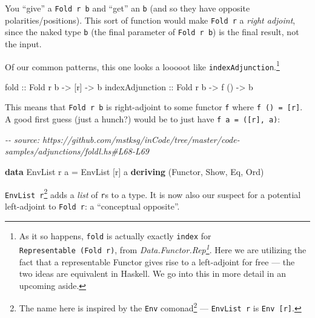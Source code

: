 \documentclass[]{article}
\newenvironment{Shaded}{}{}
\newcommand{\CommentTok}[1]{\textcolor[rgb]{0.38,0.63,0.69}{\textit{#1}}}
\newcommand{\DataTypeTok}[1]{\textcolor[rgb]{0.56,0.13,0.00}{#1}}
\newcommand{\KeywordTok}[1]{\textcolor[rgb]{0.00,0.44,0.13}{\textbf{#1}}}
\newcommand{\NormalTok}[1]{#1}
\newcommand{\OtherTok}[1]{\textcolor[rgb]{0.00,0.44,0.13}{#1}}
\renewcommand{\href}[2]{#2\footnote{\url{#1}}}
\begin{document}
You ``give'' a \texttt{Fold\ r\ b} and ``get'' an \texttt{b} (and so they have
opposite polarities/positions). This sort of function would make
\texttt{Fold\ r} a \emph{right adjoint}, since the naked type \texttt{b} (the
final parameter of \texttt{Fold\ r\ b}) is the final result, not the input.

Of our common patterns, this one looks a looooot like
\texttt{indexAdjunction}.\footnote{As it so happens, \texttt{fold} is actually
  exactly \texttt{index} for \texttt{Representable\ (Fold\ r)}, from
  \emph{\href{https://hackage.haskell.org/package/adjunctions/docs/Data-Functor-Rep.html}{Data.Functor.Rep}}.
  Here we are utilizing the fact that a representable Functor gives rise to a
  left-adjoint for free --- the two ideas are equivalent in Haskell. We go into
  this in more detail in an upcoming aside.}

\begin{Shaded}
\begin{Highlighting}[]
\OtherTok{fold            ::} \DataTypeTok{Fold}\NormalTok{ r b }\OtherTok{{-}>}\NormalTok{ [r]  }\OtherTok{{-}>}\NormalTok{ b}
\OtherTok{indexAdjunction ::} \DataTypeTok{Fold}\NormalTok{ r b }\OtherTok{{-}>}\NormalTok{ f () }\OtherTok{{-}>}\NormalTok{ b}
\end{Highlighting}
\end{Shaded}

This means that \texttt{Fold\ r\ b} is right-adjoint to some functor \texttt{f}
where \texttt{f\ ()\ =\ {[}r{]}}. A good first guess (just a hunch?) would be to
just have \texttt{f\ a\ =\ ({[}r{]},\ a)}:

\begin{Shaded}
\begin{Highlighting}[]
\CommentTok{{-}{-} source: https://github.com/mstksg/inCode/tree/master/code{-}samples/adjunctions/foldl.hs\#L68{-}L69}

\KeywordTok{data} \DataTypeTok{EnvList}\NormalTok{ r a }\OtherTok{=} \DataTypeTok{EnvList}\NormalTok{ [r] a}
  \KeywordTok{deriving}\NormalTok{ (}\DataTypeTok{Functor}\NormalTok{, }\DataTypeTok{Show}\NormalTok{, }\DataTypeTok{Eq}\NormalTok{, }\DataTypeTok{Ord}\NormalTok{)}
\end{Highlighting}
\end{Shaded}

\texttt{EnvList\ r}\footnote{The name here is inspired by the
  \href{https://hackage.haskell.org/package/comonad/docs/Control-Comonad-Trans-Env.html}{\texttt{Env}
  comonad} --- \texttt{EnvList\ r} is \texttt{Env\ {[}r{]}}.} adds a \emph{list}
of \texttt{r}s to a type. It is now also our suspect for a potential
left-adjoint to \texttt{Fold\ r}: a ``conceptual opposite''.
\end{document}
